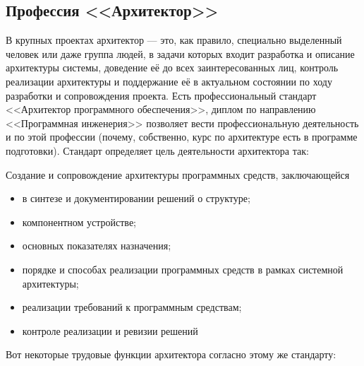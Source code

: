 \documentclass[a5paper]{article}
\begin{document}
\subsection{Профессия <<Архитектор>>}

В крупных проектах архитектор --- это, как правило, специально выделенный человек или даже группа людей, в задачи которых входит разработка и описание архитектуры системы, доведение её до всех заинтересованных лиц, контроль реализации архитектуры и поддержание её в актуальном состоянии по ходу разработки и сопровождения проекта. Есть профессиональный стандарт <<Архитектор программного обеспечения>>, диплом по направлению <<Программная инженерия>> позволяет вести профессиональную деятельность и по этой профессии (почему, собственно, курс по архитектуре есть в программе подготовки). Стандарт определяет цель деятельности архитектора так:

{\ttfamily
Создание и сопровождение архитектуры программных средств, заключающейся 
    \begin{itemize}
        \item в синтезе и документировании решений о структуре;
        \item компонентном устройстве;
        \item основных показателях назначения; 
        \item порядке и способах реализации программных средств в рамках системной архитектуры; 
        \item реализации требований к программным средствам; 
        \item контроле реализации и ревизии решений
    \end{itemize}
}

Вот некоторые трудовые функции архитектора согласно этому же стандарту:
\end{document}
